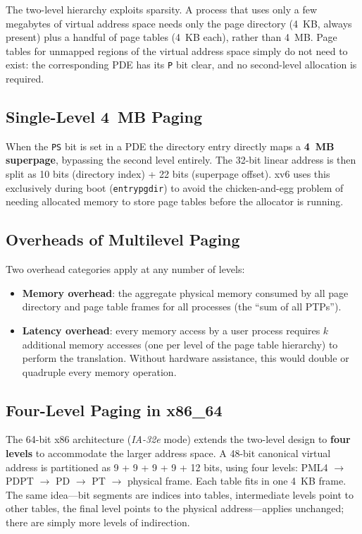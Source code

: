 \documentclass[11pt]{article}
\begin{document}
The two-level hierarchy exploits sparsity. A process that uses only a few megabytes of virtual address space needs only the page directory (4~KB, always present) plus a handful of page tables (4~KB each), rather than 4~MB. Page tables for unmapped regions of the virtual address space simply do not need to exist: the corresponding PDE has its \texttt{P} bit clear, and no second-level allocation is required.

\subsection{Single-Level 4~MB Paging}

When the \texttt{PS} bit is set in a PDE the directory entry directly maps a \textbf{4~MB superpage}, bypassing the second level entirely. The 32-bit linear address is then split as 10 bits (directory index) + 22 bits (superpage offset). xv6 uses this exclusively during boot (\texttt{entrypgdir}) to avoid the chicken-and-egg problem of needing allocated memory to store page tables before the allocator is running.

\subsection{Overheads of Multilevel Paging}

Two overhead categories apply at any number of levels:

\begin{itemize}
    \item \textbf{Memory overhead}: the aggregate physical memory consumed by all page directory and page table frames for all processes (the ``sum of all PTPs'').
    \item \textbf{Latency overhead}: every memory access by a user process requires $k$ additional memory accesses (one per level of the page table hierarchy) to perform the translation. Without hardware assistance, this would double or quadruple every memory operation.
\end{itemize}

\subsection{Four-Level Paging in x86\_64}

The 64-bit x86 architecture (\emph{IA-32e} mode) extends the two-level design to \textbf{four levels} to accommodate the larger address space. A 48-bit canonical virtual address is partitioned as 9 + 9 + 9 + 9 + 12 bits, using four levels: PML4 $\to$ PDPT $\to$ PD $\to$ PT $\to$ physical frame. Each table fits in one 4~KB frame. The same idea---bit segments are indices into tables, intermediate levels point to other tables, the final level points to the physical address---applies unchanged; there are simply more levels of indirection.
\end{document}
